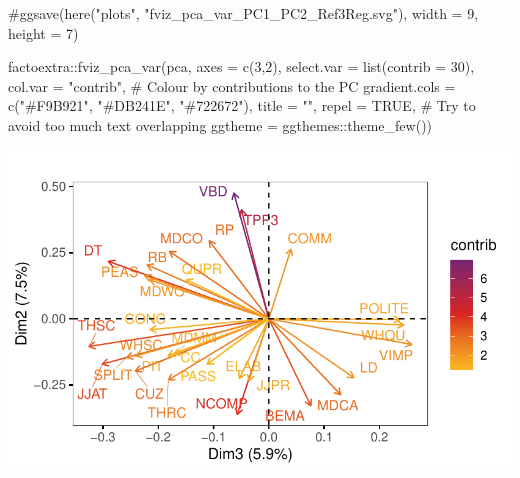 \documentclass[
  letterpaper,
  DIV=11,
  numbers=noendperiod]{scrreprt}
\newenvironment{Shaded}{\begin{snugshade}}{\end{snugshade}}
\newcommand{\AttributeTok}[1]{\textcolor[rgb]{0.40,0.45,0.13}{#1}}
\newcommand{\CommentTok}[1]{\textcolor[rgb]{0.37,0.37,0.37}{#1}}
\newcommand{\ConstantTok}[1]{\textcolor[rgb]{0.56,0.35,0.01}{#1}}
\newcommand{\DecValTok}[1]{\textcolor[rgb]{0.68,0.00,0.00}{#1}}
\newcommand{\FunctionTok}[1]{\textcolor[rgb]{0.28,0.35,0.67}{#1}}
\newcommand{\NormalTok}[1]{\textcolor[rgb]{0.00,0.23,0.31}{#1}}
\newcommand{\SpecialCharTok}[1]{\textcolor[rgb]{0.37,0.37,0.37}{#1}}
\newcommand{\StringTok}[1]{\textcolor[rgb]{0.13,0.47,0.30}{#1}}
\begin{document}
\begin{Shaded}
\begin{Highlighting}[]
\CommentTok{\#ggsave(here("plots", "fviz\_pca\_var\_PC1\_PC2\_Ref3Reg.svg"), width = 9, height = 7)}

\NormalTok{factoextra}\SpecialCharTok{::}\FunctionTok{fviz\_pca\_var}\NormalTok{(pca,}
             \AttributeTok{axes =} \FunctionTok{c}\NormalTok{(}\DecValTok{3}\NormalTok{,}\DecValTok{2}\NormalTok{),}
             \AttributeTok{select.var =} \FunctionTok{list}\NormalTok{(}\AttributeTok{contrib =} \DecValTok{30}\NormalTok{),}
             \AttributeTok{col.var =} \StringTok{"contrib"}\NormalTok{, }\CommentTok{\# Colour by contributions to the PC}
             \AttributeTok{gradient.cols =} \FunctionTok{c}\NormalTok{(}\StringTok{"\#F9B921"}\NormalTok{, }\StringTok{"\#DB241E"}\NormalTok{, }\StringTok{"\#722672"}\NormalTok{),}
             \AttributeTok{title =} \StringTok{""}\NormalTok{,}
             \AttributeTok{repel =} \ConstantTok{TRUE}\NormalTok{, }\CommentTok{\# Try to avoid too much text overlapping}
             \AttributeTok{ggtheme =}\NormalTok{ ggthemes}\SpecialCharTok{::}\FunctionTok{theme\_few}\NormalTok{())}
\end{Highlighting}
\end{Shaded}

\includegraphics{G_Ch7_Analysis_files/figure-pdf/graphs-of-variables-2.pdf}
\end{document}
